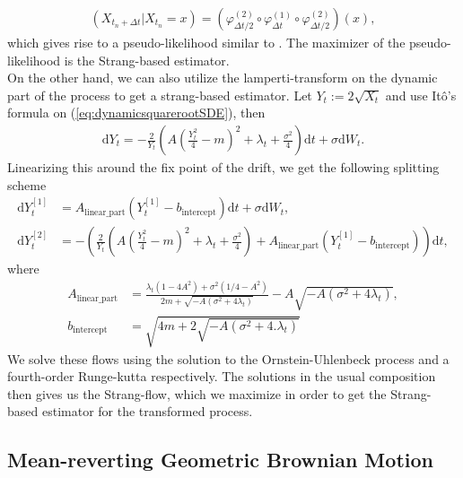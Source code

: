 \begin{align}
    \left(X_{t_n + \Delta t} | X_{t_n} = x\right) = \left(\varphi_{\Delta t/2}^{(2)} \circ \varphi_{\Delta t}^{(1)} \circ \varphi_{\Delta t/2}^{(2)}\right)(x),
\end{align} 
which gives rise to a pseudo-likelihood similar to \cite[(14)]{SplittingSchemes}. The maximizer of the pseudo-likelihood is the Strang-based estimator.\\
On the other hand, we can also utilize the lamperti-transform on the dynamic part of the process to get a strang-based estimator. Let $Y_t:= 2\sqrt{X_t}$ and use Itô's formula on (\ref{eq:dynamicsquarerootSDE}), then
\begin{align}
    \mathrm{d}Y_t = - \frac{2}{Y_t}\left(A\left(\frac{Y_t^2}{4} - m\right)^2 + \lambda_t + \frac{\sigma^2}{4}\right)\mathrm{d}t + \sigma \mathrm{d}W_t.
\end{align}
Linearizing this around the fix point of the drift, we get the following splitting scheme
\begin{align}
    \mathrm{d}Y_t^{[1]} &= A_{\mathrm{linear\_part}}\left(Y_t^{[1]} - b_{\mathrm{intercept}}\right)\mathrm{d}t + \sigma \mathrm{d}W_t,\\
    \mathrm{d}Y_t^{[2]} &= - \left(\frac{2}{Y_t}\left(A\left(\frac{Y_t^2}{4} - m\right)^2 + \lambda_t + \frac{\sigma^2}{4}\right) + A_{\mathrm{linear\_part}}\left(Y_t^{[1]} - b_{\mathrm{intercept}}\right)\right)\mathrm{d}t,
\end{align}
where 
\begin{align}
    A_{\mathrm{linear\_part}} &= \frac{\lambda_t \left(1 - 4A^2\right) + \sigma^2 \left(1/4 - A^2\right)}{2m + \sqrt{-A\left(\sigma^2 + 4 \lambda_t\right)}} - A \sqrt{-A\left(\sigma^2 + 4 \lambda_t\right)},  \\
    b_{\mathrm{intercept}} &= \sqrt{4m + 2 \sqrt{-A\left(\sigma^2 + 4 .\lambda_t\right)}}
\end{align}
We solve these flows using the solution to the Ornstein-Uhlenbeck process and a fourth-order Runge-kutta respectively. The solutions in the usual composition then gives us the Strang-flow, which we maximize in order to get the Strang-based estimator for the transformed process.
\subsection{Mean-reverting Geometric Brownian Motion}\label{subsec:meanrevertingGBM}
